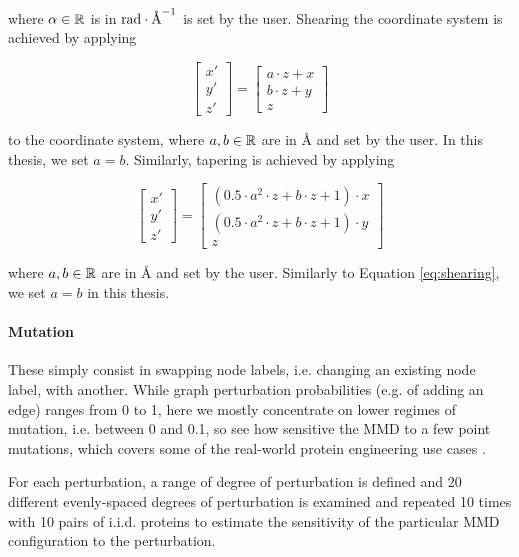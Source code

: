 where $\alpha\in\mathbb{R}$ is in $\textnormal{rad}\cdot\si{
\angstrom}^{-1}$ is set by the user. Shearing the coordinate system is achieved
by applying

\begin{equation}
  \label{eq:shearing}
  \begin{bmatrix}
    x' \\
    y' \\
    z'
  \end{bmatrix} =
  \begin{bmatrix}
    a \cdot z + x\\
    b \cdot z + y\\
    z
  \end{bmatrix}
\end{equation}

to the coordinate system, where $a, b\in\mathbb{R}$ are in \si{\angstrom} and set by the user. In this thesis, we set $a=b$. Similarly,
tapering is achieved by applying


\begin{equation}
  \label{eq:tapering}
  \begin{bmatrix}
    x' \\
    y' \\
    z'
  \end{bmatrix} =
  \begin{bmatrix}
    (0.5\cdot a^2\cdot z + b\cdot z + 1) \cdot x\\
    (0.5\cdot a^2\cdot z + b\cdot z + 1) \cdot y\\
    z
  \end{bmatrix}
\end{equation}

where $a, b\in\mathbb{R}$ are in \si{\angstrom} and set by the user. Similarly to
Equation \ref{eq:shearing}, we set $a=b$ in this thesis.

\paragraph{Mutation} These simply consist in swapping node labels, i.e.
changing an existing node label, with another. While graph perturbation
probabilities (e.g. of adding an edge) ranges from 0 to 1, here we mostly
concentrate on lower regimes of mutation, i.e. between 0 and 0.1, so see how
sensitive the MMD to a few point mutations, which covers some of the
real-world protein engineering use cases \citep{poluri2016protein}.

For each perturbation, a range of degree of perturbation is defined and 20
different evenly-spaced degrees of perturbation is examined and repeated 10
times with 10 pairs of i.i.d. proteins to estimate the sensitivity of the
particular MMD configuration to the perturbation.

